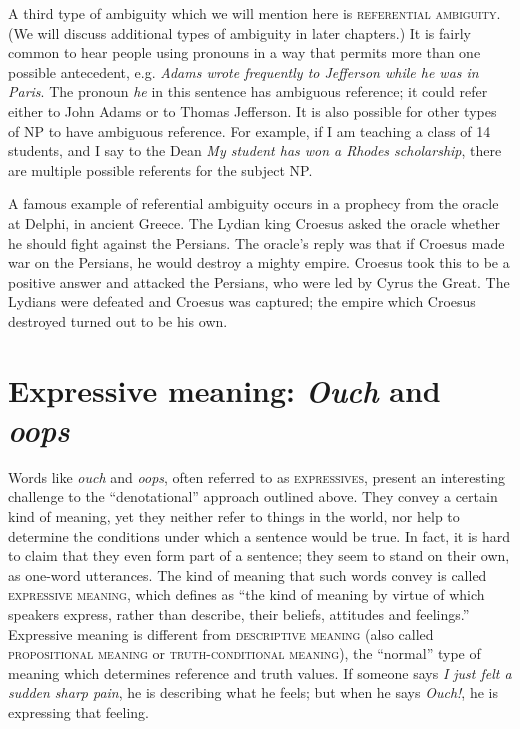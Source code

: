 A third type of ambiguity which we will mention here is \textsc{referential ambiguity}. (We will discuss additional types of ambiguity in later chapters.) It is fairly common to hear people using pronouns in a way that permits more than one possible antecedent, e.g. \textit{Adams wrote frequently to Jefferson while he was in Paris}. The pronoun \textit{he} in this sentence has ambiguous reference; it could refer either to John Adams or to Thomas Jefferson. It is also possible for other types of NP to have ambiguous reference. For example, if I am teaching a class of 14 students, and I say to the Dean \textit{My student has won a Rhodes scholarship}, there are multiple possible referents for the subject NP.\largerpage[1]



A famous example of referential ambiguity occurs in a prophecy from the oracle at Delphi, in ancient Greece. The Lydian king Croesus asked the oracle whether he should fight against the Persians. The oracle’s reply was that if Croesus made war on the Persians, he would destroy a mighty empire. Croesus took this to be a positive answer and attacked the Persians, who were led by Cyrus the Great. The Lydians were defeated and Croesus was captured; the empire which Croesus destroyed turned out to be his own.


\section{Expressive meaning: \textit{Ouch} and \textit{oops}}\label{sec:2.6}

Words like \textit{ouch} and \textit{oops}, often referred to as \textsc{expressives}, present an interesting challenge to the “denotational” approach outlined above. They convey a certain kind of meaning, yet they neither refer to things in the world, nor help to determine the conditions under which a sentence would be true. In fact, it is hard to claim that they even form part of a sentence; they seem to stand on their own, as one-word utterances. The kind of meaning that such words convey is called \textsc{expressive meaning}, which \citet[44]{Lyons1995} defines as “the kind of meaning by virtue of which speakers express, rather than describe, their beliefs, attitudes and feelings.” Expressive meaning is different from \textsc{descriptive meaning} (also called \textsc{propositional meaning} or \textsc{truth-conditional meaning}), the “normal” type of meaning which determines reference and truth values. If someone says \textit{I just felt a sudden sharp pain}, he is describing what he feels; but when he says \textit{Ouch!}, he is expressing that feeling.



